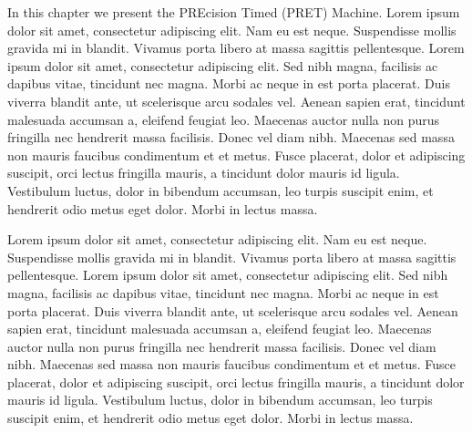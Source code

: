 In this chapter we present the PREcision Timed (PRET) Machine. 
Lorem ipsum dolor sit amet, consectetur adipiscing elit. Nam eu est neque. Suspendisse mollis gravida mi in blandit. Vivamus porta libero at massa sagittis pellentesque. Lorem ipsum dolor sit amet, consectetur adipiscing elit. Sed nibh magna, facilisis ac dapibus vitae, tincidunt nec magna. Morbi ac neque in est porta placerat. Duis viverra blandit ante, ut scelerisque arcu sodales vel. Aenean sapien erat, tincidunt malesuada accumsan a, eleifend feugiat leo. Maecenas auctor nulla non purus fringilla nec hendrerit massa facilisis. Donec vel diam nibh. Maecenas sed massa non mauris faucibus condimentum et et metus. Fusce placerat, dolor et adipiscing suscipit, orci lectus fringilla mauris, a tincidunt dolor mauris id ligula. Vestibulum luctus, dolor in bibendum accumsan, leo turpis suscipit enim, et hendrerit odio metus eget dolor. Morbi in lectus massa.

Lorem ipsum dolor sit amet, consectetur adipiscing elit. Nam eu est neque. Suspendisse mollis gravida mi in blandit. Vivamus porta libero at massa sagittis pellentesque. Lorem ipsum dolor sit amet, consectetur adipiscing elit. Sed nibh magna, facilisis ac dapibus vitae, tincidunt nec magna. Morbi ac neque in est porta placerat. Duis viverra blandit ante, ut scelerisque arcu sodales vel. Aenean sapien erat, tincidunt malesuada accumsan a, eleifend feugiat leo. Maecenas auctor nulla non purus fringilla nec hendrerit massa facilisis. Donec vel diam nibh. Maecenas sed massa non mauris faucibus condimentum et et metus. Fusce placerat, dolor et adipiscing suscipit, orci lectus fringilla mauris, a tincidunt dolor mauris id ligula. Vestibulum luctus, dolor in bibendum accumsan, leo turpis suscipit enim, et hendrerit odio metus eget dolor. Morbi in lectus massa.
